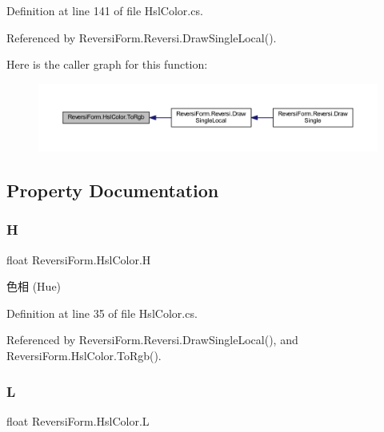 Definition at line 141 of file Hsl\+Color.\+cs.



Referenced by Reversi\+Form.\+Reversi.\+Draw\+Single\+Local().

Here is the caller graph for this function\+:
\nopagebreak
\begin{figure}[H]
\begin{center}
\leavevmode
\includegraphics[width=350pt]{class_reversi_form_1_1_hsl_color_aa7036039dd3abc7a1216be97656467df_icgraph}
\end{center}
\end{figure}


\subsection{Property Documentation}
\mbox{\label{class_reversi_form_1_1_hsl_color_ac1a2beeeae8bc7b8484ae7f3558fea53}} 
\subsubsection{\texorpdfstring{H}{H}}
{\footnotesize\ttfamily float Reversi\+Form.\+Hsl\+Color.\+H\hspace{0.3cm}{\ttfamily [get]}}



色相 (Hue) 



Definition at line 35 of file Hsl\+Color.\+cs.



Referenced by Reversi\+Form.\+Reversi.\+Draw\+Single\+Local(), and Reversi\+Form.\+Hsl\+Color.\+To\+Rgb().

\mbox{\label{class_reversi_form_1_1_hsl_color_a89e26c46eff241c066507625ddd5dc22}} 
\subsubsection{\texorpdfstring{L}{L}}
{\footnotesize\ttfamily float Reversi\+Form.\+Hsl\+Color.\+L\hspace{0.3cm}{\ttfamily [get]}}



